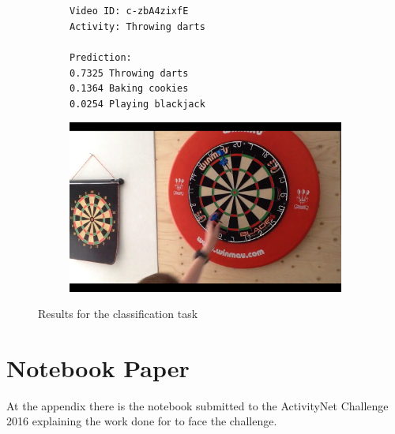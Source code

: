 \begin{figure}[H]
\centering
\begin{subfigure}[b]{.4\textwidth}
  \texttt{Video ID: c-zbA4zixfE \\
  Activity: Throwing darts \\
  \\
  Prediction: \\
  0.7325	Throwing darts \\
  0.1364	Baking cookies \\
  0.0254	Playing blackjack \\}
\end{subfigure}%
\begin{subfigure}[b]{.6\textwidth}
  \centering
\includegraphics[width=0.95\linewidth]{img/results/results_visualization_classification_5}
\end{subfigure}

\caption{Results for the classification task}
\label{fig:results_visualization_classification_annex}
\end{figure}


\chapter{Notebook Paper}

At the appendix there is the notebook submitted to the ActivityNet Challenge 2016 explaining the work done for to face the challenge.

